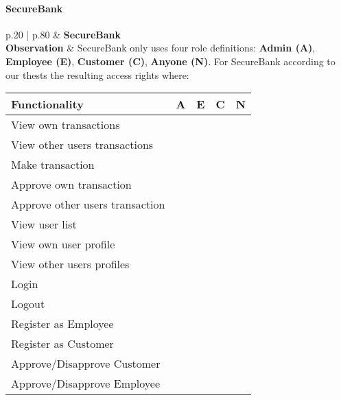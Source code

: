 \paragraph{SecureBank} \mbox{}
\begin{longtable*}{p{.20\textwidth} | p{.80\textwidth}}
    \hline
    & \textbf{SecureBank} \\ 
    \hline
    \textbf{Observation} &
    	SecureBank only uses four role definitions: \textbf{Admin (A)}, \textbf{Employee (E)}, \textbf{Customer (C)}, \textbf{Anyone (N)}.
		For SecureBank according to our thests the resulting access rights where:
		\begin{center}
		    \begin{tabular}{ | l | l | l | l | l |}
		    \hline
		    \textbf{Functionality} 			& \textbf{A} & \textbf{E} & \textbf{C} & \textbf{N} \\ \hline
		    View own transactions 			& \xmark  	& \xmark  	& \cmark 	& \xmark \\ \hline
		    View other users transactions 	& \cmark  	& \cmark 	& \xmark	& \xmark \\ \hline
		    Make transaction 				& \xmark  	& \xmark 	& \cmark 	& \xmark \\ \hline
		    Approve own transaction 		& \xmark  	& \xmark 	& \xmark 	& \xmark \\ \hline
		    Approve other users transaction & \cmark  	& \cmark 	& \xmark 	& \xmark \\ \hline
		    View user list 					& \cmark  	& \cmark 	& \xmark 	& \xmark \\ \hline
		    View own user profile 			& \cmark  	& \cmark 	& \cmark 	& \xmark \\ \hline
		    View other users profiles 		& \cmark  	& \cmark 	& \xmark 	& \xmark \\ \hline
		    Login 							& \cmark  	& \cmark 	& \cmark 	& \xmark \\ \hline
		    Logout 							& \cmark  	& \cmark 	& \cmark 	& \xmark \\ \hline
		    Register as Employee 			& \xmark  	& \xmark 	& \xmark 	& \cmark \\ \hline
		    Register as Customer 			& \xmark  	& \xmark 	& \xmark 	& \cmark \\ \hline
		    Approve/Disapprove Customer 	& \cmark  	& \cmark 	& \xmark 	& \xmark \\ \hline
		    Approve/Disapprove Employee 	& \cmark  	& \xmark 	& \xmark 	& \xmark \\ \hline
		    \end{tabular}

\end{center}
\end{longtable*}

